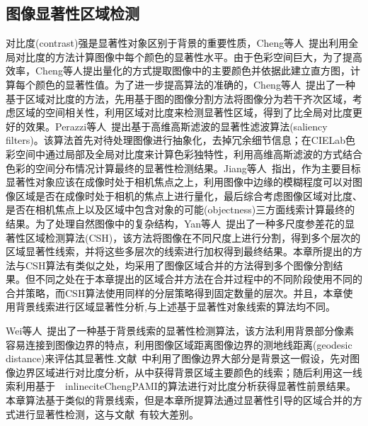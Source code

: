 \subsection{图像显著性区域检测}
\label{sec:SaliencyDetection}
对比度(contrast)强是显著性对象区别于背景的重要性质，Cheng等人~\cite{ChengPAMI}提出利用全局对比度的方法计算图像中每个颜色的显著性水平。由于色彩空间巨大，为了提高效率，Cheng等人提出量化的方式提取图像中的主要颜色并依据此建立直方图，计算每个颜色的显著性值。为了进一步提高算法的准确的，Cheng等人~\cite{ChengPAMI}提出了一种基于区域对比度的方法，先用基于图的图像分割方法将图像分为若干齐次区域，考虑区域的空间相关性，利用区域对比度来检测显著性区域，得到了比全局对比度更好的效果。Perazzi等人~\cite{saliencyFilter}提出基于高维高斯滤波的显著性滤波算法(saliency filters)。该算法首先对待处理图像进行抽象化，去掉冗余细节信息；在CIELab色彩空间中通过局部及全局对比度来计算色彩独特性，利用高维高斯滤波的方式结合色彩的空间分布情况计算最终的显著性检测结果。Jiang等人~\cite{ufo}指出，作为主要目标显著性对象应该在成像时处于相机焦点之上，利用图像中边缘的模糊程度可以对图像区域是否在成像时处于相机的焦点上进行量化，最后综合考虑图像区域对比度、是否在相机焦点上以及区域中包含对象的可能(objectness)三方面线索计算最终的结果。为了处理自然图像中的复杂结构，Yan等人~\cite{ECSSD}提出了一种多尺度参差花的显著性区域检测算法(CSH)，该方法将图像在不同尺度上进行分割，得到多个层次的区域显著性线索，并将这些多层次的线索进行加权得到最终结果。本章所提出的方法与CSH算法有类似之处，均采用了图像区域合并的方法得到多个图像分割结果。但不同之处在于本章提出的区域合并方法在合并过程中的不同阶段使用不同的合并策略，而CSH算法使用同样的分层策略得到固定数量的层次。并且，本章使用背景线索进行区域显著性分析,与上述基于显著性对象线索的算法均不同。\par
Wei等人~\cite{geodesicDistance}提出了一种基于背景线索的显著性检测算法，该方法利用背景部分像素容易连接到图像边界的特点，利用图像区域距离图像边界的测地线距离(geodesic distance)来评估其显著性.文献~中利用了图像边界大部分是背景这一假设，先对图像边界区域进行对比度分析，从中获得背景区域主要颜色的线索；随后利用这一线索利用基于~\ inlinecite{ChengPAMI}的算法进行对比度分析获得显著性前景结果。本章算法基于类似的背景线索，但是本章所提算法通过显著性引导的区域合并的方式进行显著性检测，这与文献~有较大差别。

